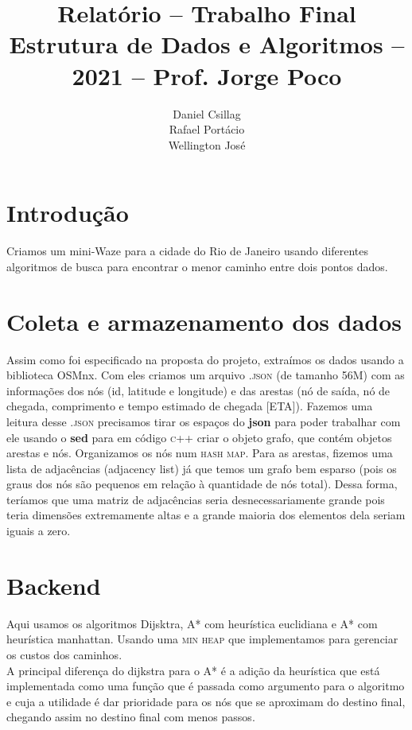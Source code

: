 \documentclass{article}
\title{Relatório -- Trabalho Final \\
       \large Estrutura de Dados e Algoritmos -- 2021 -- Prof. Jorge Poco}
\author{Daniel Csillag \\ Rafael Portácio \\ Wellington José}
\begin{document}
\maketitle

\section{Introdução}
Criamos um mini-Waze para a cidade do Rio de Janeiro usando diferentes algoritmos de busca para encontrar o menor caminho entre dois pontos dados. 

\section{Coleta e armazenamento dos dados}

Assim como foi especificado na proposta do projeto, extraímos os dados usando a biblioteca OSMnx. Com eles criamos um arquivo \textsc{.json} (de tamanho 56M) com as informações dos nós (id, latitude e longitude) e das arestas (nó de saída, nó de chegada, comprimento e tempo estimado de chegada [ETA]). Fazemos uma leitura desse \textsc{.json} precisamos tirar os espaços do \textbf{json} para poder trabalhar com ele usando o \textbf{sed} para em código \textsc{c++} criar o objeto grafo, que contém objetos arestas e nós. Organizamos os nós num \textsc{hash map}. Para as arestas, fizemos uma lista de adjacências (adjacency list) já que temos um grafo bem esparso (pois os graus dos nós são pequenos em relação à quantidade de nós total). Dessa forma, teríamos que uma matriz de adjacências seria desnecessariamente grande pois teria dimensões extremamente altas e a grande maioria dos elementos dela seriam iguais a zero.

\section{Backend}

Aqui usamos os algoritmos Dijsktra, A* com heurística euclidiana e A* com heurística manhattan. Usando uma \textsc{min heap} que implementamos para gerenciar os custos dos caminhos. \\

A principal diferença do dijkstra para o A* é a adição da heurística que está implementada como uma função que é passada como argumento para o algoritmo e cuja a utilidade é dar prioridade para os nós que se aproximam do destino final, chegando assim no destino final com menos passos.
\end{document}
